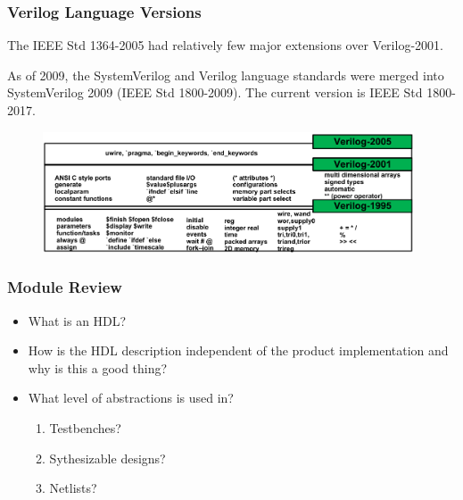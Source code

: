 \documentclass[t]{beamer}
\begin{document}
\begin{frame}
\frametitle{Verilog Language Versions}

The IEEE Std 1364-2005 had relatively few major extensions over Verilog-2001.
\newline

As of 2009, the SystemVerilog and Verilog language standards were merged into SystemVerilog 2009 (IEEE Std 1800-2009). The current version is IEEE Std 1800-2017.

\begin{figure}[H!]
    \includegraphics[width=0.98\textwidth]{img/01_ver.png}
\end{figure}

\end{frame}

\begin{frame}
\frametitle{Module Review}

\begin{itemize}
\item What is an HDL?
\item How is the HDL description independent of the product implementation and why is this a good thing?
\item What level of abstractions is used in?
\begin{enumerate}
	\item Testbenches?
	\item Sythesizable designs?
	\item Netlists?
\end{enumerate}
\end{itemize}
\end{frame}
\end{document}

